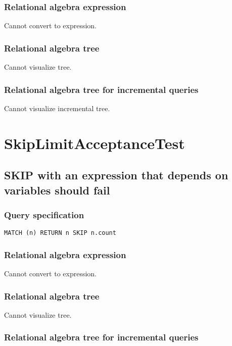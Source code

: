 \subsubsection*{Relational algebra expression}

Cannot convert to expression.

\subsubsection*{Relational algebra tree}

Cannot visualize tree.

\subsubsection*{Relational algebra tree for incremental queries}

Cannot visualize incremental tree.

\section{SkipLimitAcceptanceTest}

\subsection{SKIP with an expression that depends on variables should fail}

\subsubsection*{Query specification}

\begin{lstlisting}
MATCH (n) RETURN n SKIP n.count
\end{lstlisting}

\subsubsection*{Relational algebra expression}

Cannot convert to expression.

\subsubsection*{Relational algebra tree}

Cannot visualize tree.

\subsubsection*{Relational algebra tree for incremental queries}

